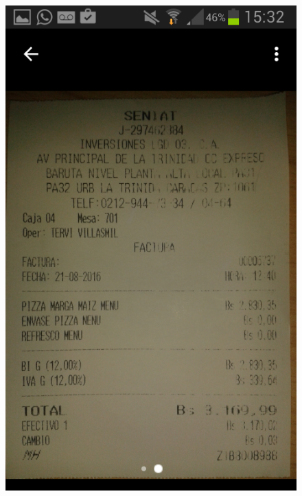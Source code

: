 \begin{figure}[ht]
\centering
\begin{minipage}{.5\textwidth}
  \centering
  \includegraphics[scale=0.30,type=png,ext=.png,read=.png]{imagenes/Screenshots/photo_view1}
  \captionsetup{justification=centering}
  \label{fig:interfazVerFoto}
\end{minipage}%
\begin{minipage}{.5\textwidth}
\centering

\end{minipage}
\end{figure}
